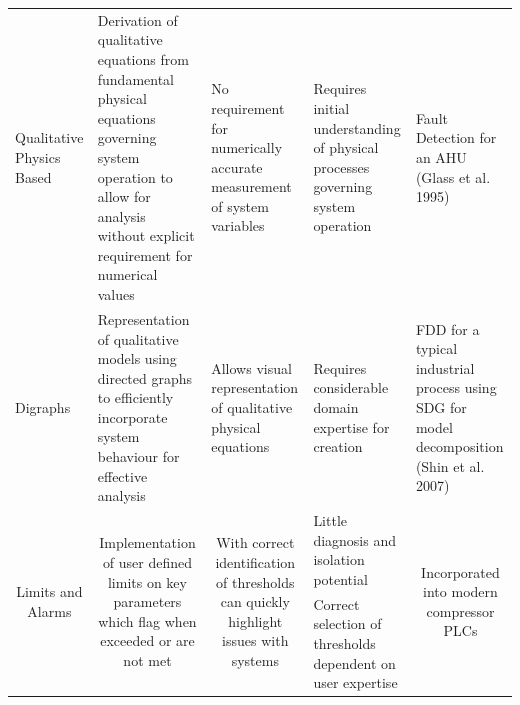 \begin{table}[htbp]
\begin{tabular}{p{}p{}p{}p{}p{}}
    Qualitative Physics Based & Derivation of qualitative equations from fundamental physical equations governing system operation to allow for analysis without explicit requirement for numerical values & No requirement for numerically accurate measurement of system variables & Requires initial understanding of physical processes governing system operation & Fault Detection for an AHU (Glass et al. 1995) \\
    Digraphs & Representation of qualitative models using directed graphs to efficiently incorporate system behaviour for effective analysis & Allows visual representation of qualitative physical equations & Requires considerable domain expertise for creation & FDD for a typical industrial process using SDG for model decomposition (Shin et al. 2007) \\
    \multicolumn{1}{c}{\multirow{2}[0]{.18\textwidth}{Limits and Alarms}} & \multicolumn{1}{c}{\multirow{2}[0]{.18\textwidth}{Implementation of user defined limits on key parameters which flag when exceeded or are not met}} & \multicolumn{1}{c}{\multirow{2}[0]{.18\textwidth}{With correct identification of thresholds can quickly highlight issues with systems}} & Little diagnosis and isolation potential & \multicolumn{1}{c}{\multirow{2}[0]{.18\textwidth}{Incorporated into modern compressor PLCs}} \\
    \multicolumn{1}{c}{} & \multicolumn{1}{c}{} & \multicolumn{1}{c}{} & Correct selection of thresholds dependent on user expertise & \multicolumn{1}{c}{} \\
    \bottomrule
    \end{tabular}%
  \label{tab:quantimodel}%
\end{table}%

